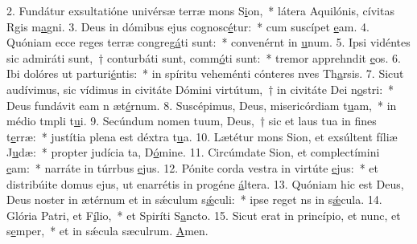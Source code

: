 2. Fundátur exsultatióne univérsæ terræ mons S\uline{i}on,~* látera Aquilónis, cívitas Rgis m\uline{a}gni.
3. Deus in dómibus ejus cognosc\uline{é}tur:~* cum suscípet \uline{e}am.
4. Quóniam ecce reges terræ congreg\uline{á}ti sunt:~* convenérnt in \uline{u}num.
5. Ipsi vidéntes sic admiráti sunt,~† conturbáti sunt, comm\uline{ó}ti sunt:~* tremor apprehndit \uline{e}os.
6. Ibi dolóres ut parturi\uline{é}ntis:~* in spíritu veheménti cónteres nves Th\uline{a}rsis.
7. Sicut audívimus, sic vídimus in civitáte Dómini virtútum,~† in civitáte Dei n\uline{o}stri:~* Deus fundávit eam n æt\uline{é}rnum.
8. Suscépimus, Deus, misericórdiam t\uline{u}am,~* in médio tmpli t\uline{u}i.
9. Secúndum nomen tuum, Deus,~† sic et laus tua in fines t\uline{e}rræ:~* justítia plena est déxtra t\uline{u}a.
10. Lætétur mons Sion, et exsúltent fíliæ J\uline{u}dæ:~* propter judícia ta, D\uline{ó}mine.
11. Circúmdate Sion, et complectímini \uline{e}am:~* narráte in túrrbus \uline{e}jus.
12. Pónite corda vestra in virtúte \uline{e}jus:~* et distribúite domus ejus, ut enarrétis in progéne \uline{á}ltera.
13. Quóniam hic est Deus, Deus noster in ætérnum et in sǽculum s\uline{ǽ}culi:~* ipse reget ns in s\uline{ǽ}cula.
14. Glória Patri, et F\uline{í}lio,~* et Spiríti S\uline{a}ncto.
15. Sicut erat in princípio, et nunc, et s\uline{e}mper,~* et in sǽcula sæculrum. \uline{A}men.
